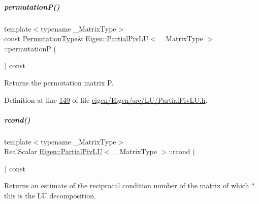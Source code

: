 \mbox{\label{group___l_u___module_a1c637530b3215787668a75ebb2e7b882}} 
\subparagraph{\texorpdfstring{permutation\+P()}{permutationP()}\hspace{0.1cm}{\footnotesize\ttfamily [2/2]}}
{\footnotesize\ttfamily template$<$typename \+\_\+\+Matrix\+Type$>$ \\
const \hyperlink{group___core___module}{Permutation\+Type}\& \hyperlink{group___l_u___module_class_eigen_1_1_partial_piv_l_u}{Eigen\+::\+Partial\+Piv\+LU}$<$ \+\_\+\+Matrix\+Type $>$\+::permutationP (\begin{DoxyParamCaption}{ }\end{DoxyParamCaption}) const\hspace{0.3cm}{\ttfamily [inline]}}

\begin{DoxyReturn}{Returns}
the permutation matrix P. 
\end{DoxyReturn}


Definition at line \hyperlink{eigen_2_eigen_2src_2_l_u_2_partial_piv_l_u_8h_source_l00149}{149} of file \hyperlink{eigen_2_eigen_2src_2_l_u_2_partial_piv_l_u_8h_source}{eigen/\+Eigen/src/\+L\+U/\+Partial\+Piv\+L\+U.\+h}.

\mbox{\label{group___l_u___module_a472b46d5d9ff7c328e1dccc13805f690}} 
\subparagraph{\texorpdfstring{rcond()}{rcond()}\hspace{0.1cm}{\footnotesize\ttfamily [1/2]}}
{\footnotesize\ttfamily template$<$typename \+\_\+\+Matrix\+Type$>$ \\
Real\+Scalar \hyperlink{group___l_u___module_class_eigen_1_1_partial_piv_l_u}{Eigen\+::\+Partial\+Piv\+LU}$<$ \+\_\+\+Matrix\+Type $>$\+::rcond (\begin{DoxyParamCaption}{ }\end{DoxyParamCaption}) const\hspace{0.3cm}{\ttfamily [inline]}}

\begin{DoxyReturn}{Returns}
an estimate of the reciprocal condition number of the matrix of which {\ttfamily $\ast$this} is the LU decomposition. 
\end{DoxyReturn}


